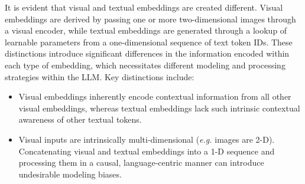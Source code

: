 

It is evident that visual and textual embeddings are created different.
Visual embeddings are derived by passing one or more two-dimensional images through a visual encoder, while textual embeddings are generated through a lookup of learnable parameters from a one-dimensional sequence of text token IDs.
These distinctions introduce significant differences in the information encoded within each type of embedding, which necessitates different modeling and processing strategies within the LLM.
Key distinctions include:

\begin{itemize}[wide,labelindent=0pt]
\item Visual embeddings inherently encode contextual information from all other visual embeddings, whereas textual embeddings lack such intrinsic contextual awareness of other textual tokens.
\item Visual inputs are intrinsically multi-dimensional (\textit{e.g.} images are 2-D). Concatenating visual and textual embeddings into a 1-D sequence and processing them in a causal, language-centric manner can introduce undesirable modeling biases.
\end{itemize}




